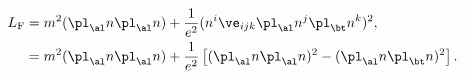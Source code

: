 \begin{equation}                                        \label{ectmfi}
\begin{split}
  L_\mathrm{F}&=m^2(\pl_\al n\pl_\al n)
  +\frac1{e^2}(n^i\ve_{ijk}\pl_\al n^j\pl_\bt n^k)^2,
\\
  &=m^2(\pl_\al n\pl_\al n)
  +\frac1{e^2}\left[(\pl_\al n\pl_\al n)^2-(\pl_\al n\pl_\bt n)^2\right].
\end{split}
\end{equation}

